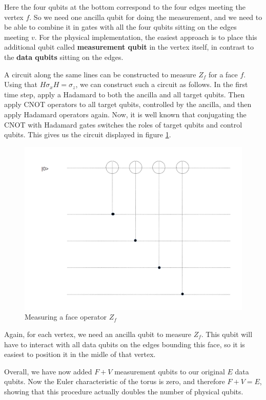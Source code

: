 \documentclass[a4paper, draft]{article}
\theoremstyle{own}
\theoremstyle{remark}
\begin{document}
Here the four qubits at the bottom correspond to the four edges meeting the vertex $f$. So we need one ancilla qubit for doing the measurement, and we need to be able to combine it in gates with all the four qubits sitting on the edges meeting $v$. For the physical implementation, the easiest approach is to place this additional qubit called {\bf measurement qubit} in the vertex itself, in contrast to the {\bf data qubits} sitting on the edges.

A circuit along the same lines can be constructed to measure $Z_f$ for a face $f$. Using that $H \sigma_x H = \sigma_z$, we can construct such a circuit as follows. In the first time step, apply a Hadamard to both the ancilla and all target qubits. Then apply CNOT operators to all target qubits, controlled by the ancilla, and then apply Hadamard operators again. Now, it is well known that conjugating the CNOT with Hadamard gates switches the roles of target qubits and control qubits. This gives us the circuit displayed in figure \ref{fig:MeasuringZv}.


\begin{figure}
\centering
\includegraphics[width=0.7\linewidth]{images/MeasuringZv}
\caption[Measuring a face operator $Z_f$]{Measuring a face operator $Z_f$}
\label{fig:MeasuringZv}
\end{figure}

Again, for each vertex, we need an ancilla qubit to measure $Z_f$. This qubit will have to interact with all data qubits on the edges bounding this face, so it is easiest to position it in the midle of that vertex. 

Overall, we have now added $F + V$ measurement qubits to our original $E$ data qubits. Now the Euler characteristic of the torus is zero, and therefore $F + V = E$, showing that this procedure actually doubles the number of physical qubits. 
\end{document}
